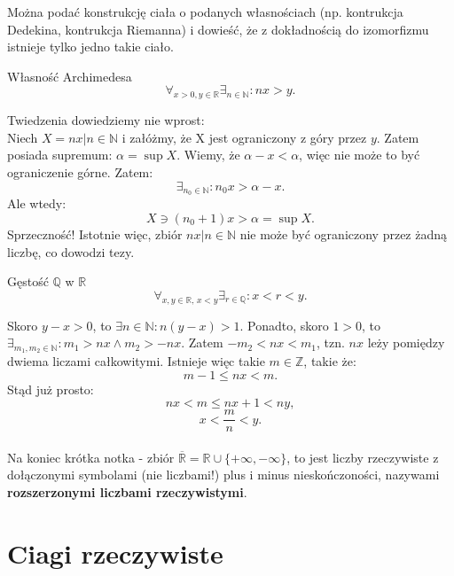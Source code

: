 \documentclass{article}
\numberwithin{defi}{section}
\numberwithin{defi}{section}
\newcommand{\R}{\mathbb{R}}
\newcommand{\N}{\mathbb{N}}
\newcommand{\Z}{\mathbb{Z}}
\newcommand{\Q}{\mathbb{Q}}
\newcommand{\oo}{\infty}
\begin{document}
Można podać konstrukcję ciała o podanych własnościach (np. kontrukcja Dedekina, kontrukcja Riemanna) i dowieść, że z dokładnością do izomorfizmu istnieje tylko jedno takie ciało.

\begin{twier}{Własność Archimedesa}
    \begin{equation}
        \forall_{x > 0, y \in \R} \exists_{n \in \N}: nx > y.
    \end{equation}
\end{twier}


\begin{dow}
    Twiedzenia dowiedziemy nie wprost:\\
    Niech $X = {nx | n \in \N}$ i załóżmy, że X jest ograniczony z góry przez $y$. Zatem posiada supremum: $\alpha = \sup X$. Wiemy, że $\alpha - x < \alpha$, więc nie może to być ograniczenie górne. Zatem:
    \[ \exists_{n_0 \in \N}: n_0 x > \alpha - x. \]
    Ale wtedy:
    \[ X \ni (n_0 + 1) x > \alpha = \sup X. \]
    Sprzeczność! Istotnie więc, zbiór ${nx | n \in \N}$ nie może być ograniczony przez żadną liczbę, co dowodzi tezy.
\end{dow}

\begin{twier}{Gęstość $\Q$ w $\R$}
    \begin{equation}
        \forall_{x, y \in \R, \, x < y} \exists_{r \in \Q}: x < r < y.
    \end{equation}
\end{twier}
\begin{dow}
    Skoro $y - x > 0$, to $\exists{n \in \N}: n(y - x) > 1$. Ponadto, skoro $1 > 0$, to $\exists_{m_1, m_2 \in \N}: m_1 > n x \land m_2 > -nx$. Zatem $-m_2 < nx < m_1$, tzn. $nx$ leży pomiędzy dwiema liczami całkowitymi. Istnieje więc takie $m \in \Z$, takie że:
    \[ m-1 \leqslant nx < m. \]
    Stąd już prosto:
    \[nx < m \leqslant nx +1 < ny,\]
    \[x < \frac{m}{n} < y.\]
\end{dow}

\paragraph*{} Na koniec krótka notka - zbiór $\overline{\R} = \R \cup \{+\oo, -\oo\}$, to jest liczby rzeczywiste z dołączonymi symbolami (nie liczbami!) plus i minus nieskończoności, nazywami \textbf{rozszerzonymi liczbami rzeczywistymi}.


\newpage
\section{Ciagi rzeczywiste}
\end{document}
